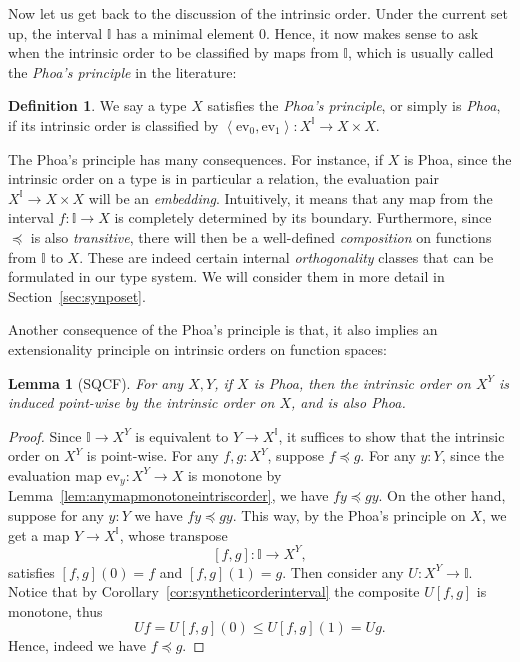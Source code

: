 \documentclass[12pt]{amsart}
\newtheorem{lemma}[theorem]{Lemma}
\theoremstyle{definition}
\newtheorem{definition}[theorem]{Definition}
\newcommand{\mbb}[1]{\mathbb{#1}}
\newcommand{\I}{\mbb I}
\newcommand{\pair}[1]{\left\langle#1\right\rangle}
\newcommand{\ev}{\mathrm{ev}}
\begin{document}
Now let us get back to the discussion of the intrinsic order. Under the current set up, the interval $\I$ has a minimal element $0$. Hence, it now makes sense to ask when the intrinsic order to be classified by maps from $\I$, which is usually called the \emph{Phoa's principle} in the literature:

\begin{definition}
  We say a type $X$ satisfies the \emph{Phoa's principle}, or simply is \emph{Phoa}, if its intrinsic order is classified by $\pair{\ev_0,\ev_1} : X^\I \to X \times X$.
\end{definition}

The Phoa's principle has many consequences. For instance, if $X$ is Phoa, since the intrinsic order on a type is in particular a relation, the evaluation pair $X^\I \to X \times X$ will be an \emph{embedding}. Intuitively, it means that any map from the interval $f : \I \to X$ is completely determined by its boundary. Furthermore, since $\preceq$ is also \emph{transitive}, there will then be a well-defined \emph{composition} on functions from $\I$ to $X$. These are indeed certain internal \emph{orthogonality} classes that can be formulated in our type system. We will consider them in more detail in Section~\ref{sec:synposet}.

Another consequence of the Phoa's principle is that, it also implies an extensionality principle on intrinsic orders on function spaces:

\begin{lemma}[SQCF]\label{lem:phoaexponential}
  For any $X,Y$, if $X$ is Phoa, then the intrinsic order on $X^Y$ is induced point-wise by the intrinsic order on $X$, and is also Phoa.
\end{lemma}
\begin{proof}
  Since $\I \to X^Y$ is equivalent to $Y \to X^\I$, it suffices to show that the intrinsic order on $X^Y$ is point-wise. For any $f,g : X^Y$, suppose $f \preceq g$. For any $y : Y$, since the evaluation map $\ev_y : X^Y \to X$ is monotone by Lemma~\ref{lem:anymapmonotoneintriscorder}, we have $fy \preceq gy$. On the other hand, suppose for any $y : Y$ we have $fy \preceq gy$. This way, by the Phoa's principle on $X$, we get a map $Y \to X^\I$, whose transpose 
  \[ [f,g] : \I \to X^Y, \]
  satisfies $[f,g](0) = f$ and $[f,g](1) = g$. Then consider any $U : X^Y \to \I$. Notice that by Corollary~\ref{cor:syntheticorderinterval} the composite $U[f,g]$ is monotone, thus
  \[ Uf = U[f,g](0) \le U[f,g](1) = Ug. \]
  Hence, indeed we have $f \preceq g$.
\end{proof}
\end{document}

